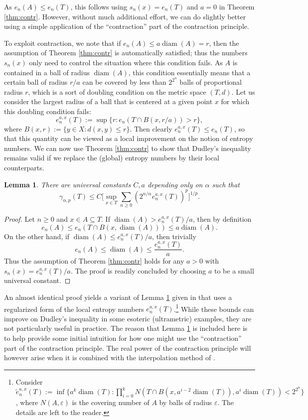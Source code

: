 \documentclass[10pt,reqno]{amsart}
\newtheorem{lem}[thm]{Lemma}
\theoremstyle{definition}
\numberwithin{equation}{section}
\numberwithin{figure}{section}
\numberwithin{table}{section}
\newcommand{\diam}{\mathop{\mathrm{diam}}}
\begin{document}
As $e_n(A)\le e_n(T)$, this follows using $s_n(x)=e_n(T)$ and $a=0$ in 
Theorem \ref{thm:contr}. However, without much additional effort, we can 
do slightly better using a simple application of the ``contraction'' part 
of the contraction principle.

To exploit contraction, we note that if $e_n(A)\le a\diam(A)=r$, then the 
assumption of Theorem \ref{thm:contr} is automatically satisfied; thus 
the numbers $s_n(x)$ only need to control the situation where this 
condition fails. As $A$ 
is contained in a ball of radius $\diam(A)$, this condition essentially 
means that a certain ball of radius $r/a$ can be covered by less than 
$2^{2^n}$ balls of proportional radius $r$, which is a sort of doubling 
condition on the metric space $(T,d)$. Let us consider the 
largest radius of a ball that is centered at a given point $x$ for which 
this doubling condition fails:
$$
	e_n^{a,x}(T) :=
	\sup\{r:e_n(T\cap B(x,r/a))>r\},
$$
where $B(x,r):=\{y\in X:d(x,y)\le r\}$. Then clearly $e_n^{a,x}(T)\le 
e_n(T)$, so that this quantity can be viewed as a local improvement on the 
notion of entropy numbers. We can now use Theorem \ref{thm:contr} to show 
that Dudley's inequality remains valid if we replace the (global) 
entropy numbers by their local counterparts.

\begin{lem}
\label{lem:localdud}
There are universal constants $C,a$ depending only on $\alpha$ such that
$$
	\gamma_{\alpha,p}(T) \le
	C\Bigg[\sup_{x\in T}
	\sum_{n\ge 0}(2^{n/\alpha}e_n^{a,x}(T))^p
	\Bigg]^{1/p}.
$$
\end{lem}

\begin{proof}
Let $n\ge 0$ and $x\in A\subseteq T$.
If $\diam(A)>e_n^{a,x}(T)/a$, then by definition
$$
	e_n(A) \le e_n(T\cap B(x,\diam(A))) \le a\diam(A).
$$
On the other hand, if $\diam(A)\le e_n^{a,x}(T)/a$, then trivially
$$
	e_n(A) \le \diam(A) \le \frac{e_n^{a,x}(T)}{a}.
$$
Thus the assumption of Theorem \ref{thm:contr} holds for any $a>0$ 
with $s_n(x) = e_n^{a,x}(T)/a$. The proof is readily concluded by choosing 
$a$ to be a small universal constant.
\end{proof}

An almost identical proof yields a variant of Lemma \ref{lem:localdud} 
given in \cite[eq.\ (1.9)]{Tal96} that uses a regularized form of 
the local entropy numbers $e_n^{a,x}(T)$.\footnote{
	Consider
	$\tilde e_n^{a,x}(T) :=
	\inf\{a^k\diam(T):\prod_{i=0}^k N(T\cap 
	B(x,a^{i-2}\diam(T)),a^i\diam(T)) < 2^{2^n}\}$,
	where $N(A,\varepsilon)$ is the covering number of $A$ by balls of 
	radius $\varepsilon$. The details are left to the reader.
}
While these bounds can improve on Dudley's inequality in some esoteric 
(ultrametric) examples, they are not particularly useful in practice. 
The reason that Lemma \ref{lem:localdud} is included here is to 
help provide some initial intuition for how one might use the
``contraction'' part of the contraction principle. The real power of the 
contraction principle will however arise when it is combined with the 
interpolation method of \cite{vH16a}.
\end{document}
